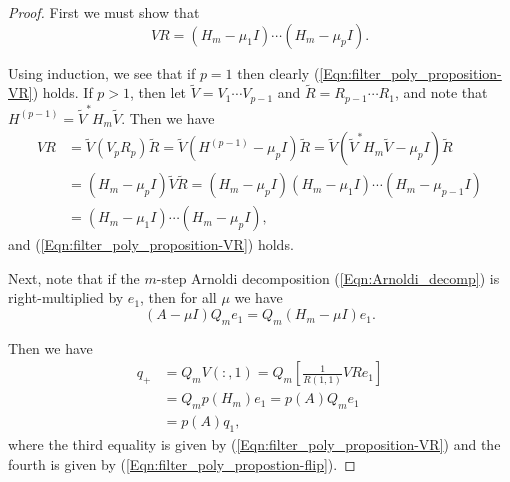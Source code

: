 \begin{proof}
First we must show that 
\begin{equation} 		\label{Eqn:filter_poly_proposition-VR}
VR = (H_m - \mu_1I) \cdots (H_m - \mu_pI).
\end{equation}

Using induction, we see that if $p=1$ then clearly (\ref{Eqn:filter_poly_proposition-VR}) holds.  If $p>1$, then let $\tilde{V}=V_1 \cdots V_{p-1}$ and $\tilde{R} = R_{p-1} \cdots R_1$, and note that $H^{(p-1)} = \tilde{V}^*H_m\tilde{V}$.  Then we have
\[
\begin{split}
VR & = \tilde{V}(V_pR_p)\tilde{R} 
	= \tilde{V} \left( H^{(p-1)} - \mu_pI \right) \tilde{R}
	= \tilde{V}\left( \tilde{V}^*H_m \tilde{V} - \mu_p I \right)\tilde{R}	\\
	& = \left(H_m - \mu_p I \right) \tilde{V}\tilde{R}
	= (H_m - \mu_p I) (H_m - \mu_1 I) \cdots (H_m - \mu_{p-1}I) 	\\
	&=  (H_m - \mu_1I) \cdots (H_m - \mu_pI),
\end{split}
\]
and (\ref{Eqn:filter_poly_proposition-VR}) holds.

Next, note that if the $m$-step Arnoldi decomposition (\ref{Eqn:Arnoldi_decomp}) is right-multiplied by $e_1$, then for all $\mu$ we have
\begin{equation} 			\label{Eqn:filter_poly_propostion-flip}
\left(A - \mu I \right)Q_me_1 = Q_m \left(H_m - \mu I \right) e_1.
\end{equation}

Then we have
\[
\begin{split}
q_+ 
	& = Q_mV(:,1) = Q_m \left[ \frac{1}{R(1,1)}VR e_1 \right] 	\\
	& 	= Q_m p(H_m) e_1 = p(A)Q_m e_1	\\
	& 	= p(A) q_1,
\end{split}
\]
where the third equality is given by (\ref{Eqn:filter_poly_proposition-VR}) and the fourth is given by (\ref{Eqn:filter_poly_propostion-flip}).
\end{proof}

\fi





